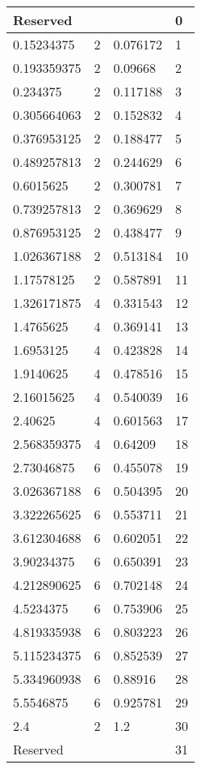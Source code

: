 \begin{longtable}{|l|l|l|l|}
\multicolumn{3}{|l|}{Reserved}  & 0 \\  \hline
    0.15234375     & 2  & 0.076172 & 1       \\ \hline
    0.193359375    & 2  & 0.09668  & 2       \\ \hline
    0.234375       & 2  & 0.117188 & 3       \\ \hline
    0.305664063    & 2  & 0.152832 & 4       \\ \hline
    0.376953125    & 2  & 0.188477 & 5       \\ \hline
    0.489257813    & 2  & 0.244629 & 6       \\ \hline
    0.6015625      & 2  & 0.300781 & 7       \\ \hline
    0.739257813    & 2  & 0.369629 & 8       \\ \hline
    0.876953125    & 2  & 0.438477 & 9       \\ \hline
    1.026367188    & 2  & 0.513184 & 10      \\ \hline
    1.17578125     & 2  & 0.587891 & 11      \\ \hline
    1.326171875    & 4  & 0.331543 & 12      \\ \hline
    1.4765625      & 4  & 0.369141 & 13      \\ \hline
    1.6953125      & 4  & 0.423828 & 14      \\ \hline
    1.9140625      & 4  & 0.478516 & 15      \\ \hline
    2.16015625     & 4  & 0.540039 & 16      \\ \hline
    2.40625        & 4  & 0.601563 & 17      \\ \hline
    2.568359375    & 4  & 0.64209  & 18      \\ \hline
    2.73046875     & 6  & 0.455078 & 19      \\ \hline
    3.026367188    & 6  & 0.504395 & 20      \\ \hline
    3.322265625    & 6  & 0.553711 & 21      \\ \hline
    3.612304688    & 6  & 0.602051 & 22      \\ \hline
    3.90234375     & 6  & 0.650391 & 23      \\ \hline
    4.212890625    & 6  & 0.702148 & 24      \\ \hline
    4.5234375      & 6  & 0.753906 & 25      \\ \hline
    4.819335938    & 6  & 0.803223 & 26      \\ \hline
    5.115234375    & 6  & 0.852539 & 27      \\ \hline
    5.334960938    & 6  & 0.88916  & 28      \\ \hline
    5.5546875      & 6  & 0.925781 & 29      \\ \hline
    2.4            & 2  & 1.2      & 30      \\ \hline
\multicolumn{3}{|l|}{Reserved}  & 31 \\  \hline
    \end{longtable}




